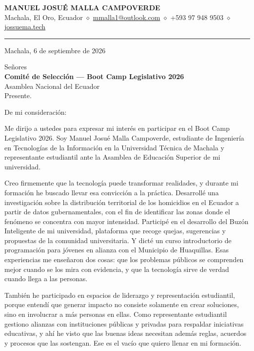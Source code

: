 \documentclass[letterpaper,11pt]{article}
\begin{document}
\begin{center}
  {\large \textbf{MANUEL JOSUÉ MALLA CAMPOVERDE}}\\[2pt]
  {\small Machala, El Oro, Ecuador $\diamond$
   \href{mailto:mmalla1@outlook.com}{mmalla1@outlook.com} $\diamond$
   +593 97 948 9503 $\diamond$
   \href{https://jossuema.tech}{jossuema.tech}}
\end{center}
\vspace{-4pt}
\rule{\textwidth}{0.9pt}
\vspace{2pt}

Machala, 6 de septiembre de 2026

Señores\\
\textbf{Comité de Selección --- Boot Camp Legislativo 2026}\\
Asamblea Nacional del Ecuador\\
Presente.

De mi consideración:

Me dirijo a ustedes para expresar mi interés en participar en el Boot Camp
Legislativo 2026. Soy Manuel Josué Malla Campoverde, estudiante de Ingeniería
en Tecnologías de la Información en la Universidad Técnica de Machala y
representante estudiantil ante la Asamblea de Educación Superior de mi
universidad.

Creo firmemente que la tecnología puede transformar realidades, y durante mi
formación he buscado llevar esa convicción a la práctica. Desarrollé una
investigación sobre la distribución territorial de los homicidios en el
Ecuador a partir de datos gubernamentales, con el fin de identificar las zonas
donde el fenómeno se concentra con mayor intensidad. Participé en el
desarrollo del Buzón Inteligente de mi universidad, plataforma que recoge
quejas, sugerencias y propuestas de la comunidad universitaria. Y dicté un
curso introductorio de programación para jóvenes en alianza con el Municipio
de Huaquillas. Esas experiencias me enseñaron dos cosas: que los problemas
públicos se comprenden mejor cuando se los mira con evidencia, y que la
tecnología sirve de verdad cuando llega a las personas.

También he participado en espacios de liderazgo y representación estudiantil,
porque entendí que generar impacto no consiste solamente en crear soluciones,
sino en involucrar a más personas en ellas. Como representante estudiantil
gestiono alianzas con instituciones públicas y privadas para respaldar
iniciativas educativas, y ahí he visto que las buenas ideas
necesitan además reglas, acuerdos y procesos que las sostengan.
Ese es el vacío que quiero llenar en mi formación.
\end{document}
